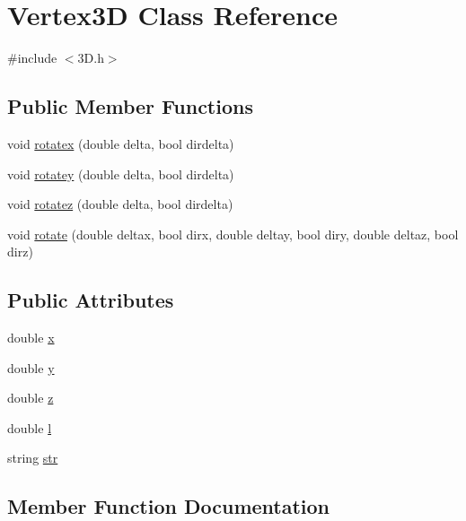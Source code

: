 \hypertarget{class_vertex3_d}{}\section{Vertex3D Class Reference}
\label{class_vertex3_d}


{\ttfamily \#include $<$3\+D.\+h$>$}

\subsection*{Public Member Functions}
\begin{DoxyCompactItemize}
\item 
void \hyperlink{class_vertex3_d_a6a4d46639e2d45b553770dfab060ed9a}{rotatex} (double delta, bool dirdelta)
\item 
void \hyperlink{class_vertex3_d_aa727424b65822afe147d0782dae6e271}{rotatey} (double delta, bool dirdelta)
\item 
void \hyperlink{class_vertex3_d_aaa4ba2539160adee485082501d522509}{rotatez} (double delta, bool dirdelta)
\item 
void \hyperlink{class_vertex3_d_a90c39da5c9d8a6d899d19f490c51bd01}{rotate} (double deltax, bool dirx, double deltay, bool diry, double deltaz, bool dirz)
\end{DoxyCompactItemize}
\subsection*{Public Attributes}
\begin{DoxyCompactItemize}
\item 
double \hyperlink{class_vertex3_d_a4f2e1e52715d4838267984cda8f69a81}{x}
\item 
double \hyperlink{class_vertex3_d_a494593d78f61f44b90df1dce15edeb62}{y}
\item 
double \hyperlink{class_vertex3_d_ae899efc1434544b4e179cb15b2a55491}{z}
\item 
double \hyperlink{class_vertex3_d_a37561365c6c6ff2805e0872d6ed5fd4a}{l}
\item 
string \hyperlink{class_vertex3_d_abf20eafb9ee16582a128d25fc38acb3e}{str}
\end{DoxyCompactItemize}


\subsection{Member Function Documentation}
